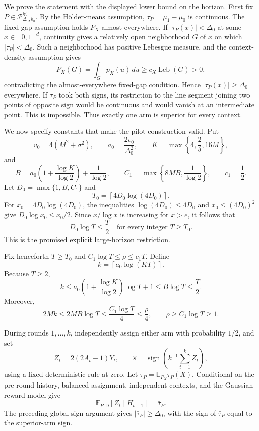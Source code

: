 We prove the statement with the displayed lower bound on the horizon.  First fix
\(P\in\mathcal P_{\Delta_0,b_0}^{\mathrm{fg}}\).  By the H\"older-means
assumption, \(\tau_P=\mu_1-\mu_0\) is continuous.  The fixed-gap assumption
holds \(P_X\)-almost everywhere.  If \(|\tau_P(x)|<\Delta_0\) at some
\(x\in[0,1]^d\), continuity gives a relatively open neighborhood \(G\) of
\(x\) on which \(|\tau_P|<\Delta_0\).  Such a neighborhood has positive
Lebesgue measure, and the context-density assumption gives
\[
 P_X(G)=\int_G p_X(u)\,du\geq c_X\operatorname{Leb}(G)>0,
\]
contradicting the almost-everywhere fixed-gap condition.  Hence
\(|\tau_P(x)|\geq\Delta_0\) everywhere.  If \(\tau_P\) took both signs, its
restriction to the line segment joining two points of opposite sign would be
continuous and would vanish at an intermediate point.  This is impossible.
Thus exactly one arm is superior for every context.

We now specify constants that make the pilot construction valid.  Put
\[
 v_0=4(M^2+\sigma^2),\qquad
 a_0=\frac{2v_0}{\Delta_0^2},\qquad
 K=\max\left\{4,\frac{2}{\delta},16M\right\},
\]
and
\[
 B=a_0\left(1+\frac{\log K}{\log 2}\right)+\frac{1}{\log 2},
 \qquad
 C_1=\max\left\{8MB,\frac{1}{\log 2}\right\},
 \qquad c_1=\frac12.
\]
Let \(D_0=\max\{1,B,C_1\}\) and
\[
 T_0=\left\lceil4D_0\log(4D_0)\right\rceil.
\]
For \(x_0=4D_0\log(4D_0)\), the inequalities
\(\log(4D_0)\leq4D_0\) and
\(x_0\leq(4D_0)^2\) give
\(D_0\log x_0\leq x_0/2\).  Since \(x/\log x\) is increasing for
\(x>e\), it follows that
\[
 D_0\log T\leq\frac{T}{2}
 \quad\text{for every integer }T\geq T_0.
\]
This is the promised explicit large-horizon restriction.

Fix henceforth \(T\geq T_0\) and
\(C_1\log T\leq\rho\leq c_1T\).  Define
\[
 k=\left\lceil a_0\log(KT)\right\rceil.
\]
Because \(T\geq2\),
\[
 k\leq a_0\left(1+\frac{\log K}{\log2}\right)\log T+1
 \leq B\log T\leq\frac{T}{2}.
\]
Moreover,
\[
 2Mk\leq2MB\log T\leq\frac{C_1\log T}{4}\leq\frac\rho4,
 \qquad
 \rho\geq C_1\log T\geq1.
\]

During rounds \(1,\ldots,k\), independently assign either arm with
probability \(1/2\), and set
\[
 Z_t=2(2A_t-1)Y_t,\qquad
 \widehat s=\operatorname{sign}\left(k^{-1}\sum_{t=1}^k Z_t\right),
\]
using a fixed deterministic rule at zero.  Let
\(\bar\tau_P=\mathbb E_{P_X}\tau_P(X)\).  Conditional on the pre-round
history, balanced assignment, independent contexts, and the Gaussian reward
model give
\[
 \mathbb E_{P,\mathsf D}[Z_t\mid H_{t-1}]=\bar\tau_P.
\]
The preceding global-sign argument gives
\(|\bar\tau_P|\geq\Delta_0\), with the sign of \(\bar\tau_P\) equal to the
superior-arm sign.

